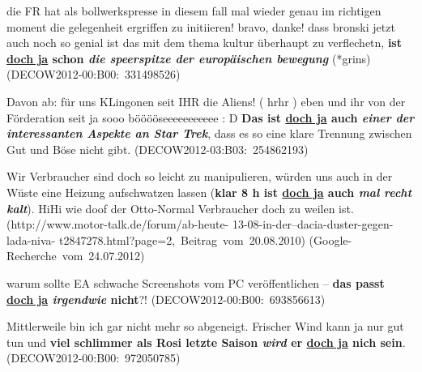 \begin{exe}
	\ex\label{470} 
	\scriptsize
	die FR hat als bollwerkspresse in diesem fall mal wieder genau im richtigen moment die gelegenheit ergriffen zu initiieren! bravo, danke! dass bronski 	jetzt auch noch so genial ist das mit dem thema kultur überhaupt zu verflechetn, \textbf{ist \underline{doch ja} schon \textit{die speerspitze der europäischen bewegung}} (*grins)
	\newline		
	\hbox{}\hfill\hbox{(DECOW2012-00:B00: 331498526)}		
\end{exe}

\begin{exe}
	\ex\label{471} 
	\scriptsize
	Davon ab: für uns KLingonen seit IHR die Aliens! ( hrhr ) eben und ihr von der Förderation seit ja sooo bööööseeeeeeeeeee : D \textbf{Das ist 				\underline{doch ja} auch \textit{einer der interessanten Aspekte an Star Trek}}, dass es so eine klare Trennung zwischen Gut und Böse nicht gibt.		
	\hfill\hbox{(DECOW2012-03:B03: 254862193)}	
	\newline		
	\hbox{}\hfill\hbox{\citet[227]{Mueller2017b}}	
\end{exe}

\begin{exe}
	\ex\label{472} 
	\scriptsize
	Wir Verbraucher sind doch so leicht zu manipulieren, würden uns auch in der Wüste eine Heizung aufschwatzen lassen (\textbf{klar 8 h ist \underline{doch ja} auch \textit{mal recht kalt}}). HiHi wie doof der Otto-Normal Verbraucher doch zu weilen ist.		
	\hfill\hbox{(http://www.motor-talk.de/forum/ab-heute-}	
	\newline		
	\hbox{}\hfill\hbox{13-08-in-der--dacia-duster-gegen-lada-niva-}	
	\newline		
	\hbox{}\hfill\hbox{t2847278.html?page=2, Beitrag vom 20.08.2010)}	
	\newline		
	\hbox{}\hfill\hbox{(Google-Recherche vom 24.07.2012)}
\end{exe} 
							                    
\begin{exe}
	\ex\label{473} 
	warum sollte EA schwache Screenshots vom PC veröffentlichen – \textbf{das passt \underline{doch ja} \textit{irgendwie} nicht}?!
	\hbox{}\hfill\hbox{(DECOW2012-00:B00: 693856613)}
\end{exe} 
		               		 		        
\begin{exe}
	\ex\label{474} 
	Mittlerweile bin ich gar nicht mehr so abgeneigt. Frischer Wind kann ja nur gut tun und \textbf{viel schlimmer als Rosi letzte Saison \textit{wird} er \underline{doch ja} nich sein}.
	\hbox{}\hfill\hbox{(DECOW2012-00:B00: 972050785)}
\end{exe} 	
	
